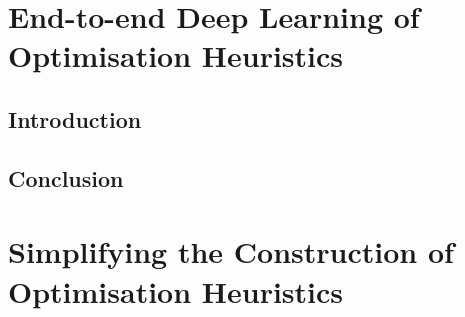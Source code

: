 \ifstapled
\chapter{End-to-end Deep Learning of Optimisation Heuristics}
\section{Introduction}
\lipsum[1-2]

\section{Conclusion}
\lipsum[1-2]
\else
\chapter{Simplifying the Construction of Optimisation Heuristics}
\label{chap:deeptune}








\fi
